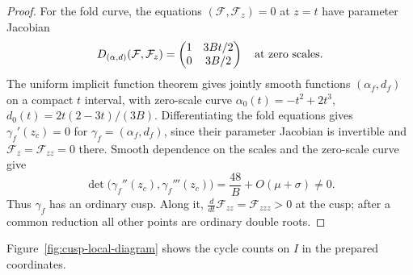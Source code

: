 \begin{proof}
For the fold curve, the equations
$(\mathcal F,\mathcal F_z)=0$ at $z=t$ have parameter Jacobian
\[
 D_{(\alpha,d)}(\mathcal F,\mathcal F_z)
 =\begin{pmatrix}1&3Bt/2\\0&3B/2\end{pmatrix}
 \quad\hbox{at zero scales}.
\]
The uniform implicit function theorem gives jointly smooth functions
$(\alpha_f,d_f)$ on a compact $t$ interval, with zero-scale curve
$\alpha_0(t)=-t^2+2t^3$, $d_0(t)=2t(2-3t)/(3B)$.
Differentiating the fold equations gives $\gamma_f'(z_c)=0$ for
$\gamma_f=(\alpha_f,d_f)$, since their parameter Jacobian is invertible
and $\mathcal F_z=\mathcal F_{zz}=0$ there. Smooth dependence on the
scales and the zero-scale curve give
\begin{equation}\label{corner:ordinary-cusp-determinant}
 \det\bigl(\gamma_f''(z_c),\gamma_f'''(z_c)\bigr)
       =\frac{48}{B}+O(\mu+\sigma)\ne0.
\end{equation}
Thus $\gamma_f$ has an ordinary cusp. Along it,
$\frac{d}{dt}\mathcal F_{zz}=\mathcal F_{zzz}>0$ at the cusp;
after a common reduction all other points are ordinary double roots.
\end{proof}

Figure~\ref{fig:cusp-local-diagram} shows the cycle counts on $I$ in the
prepared coordinates.

